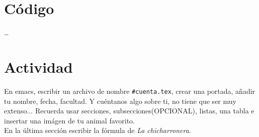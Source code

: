 \documentclass[11pt]{article} %
\begin{document}
\section{Código}
\dots

\section{Actividad}
En emacs, escribir un archivo de nombre \texttt{\#cuenta.tex}, crear una portada,
añadir tu nombre, fecha, facultad. Y cuéntanos algo sobre ti, no tiene que ser
muy extenso... Recuerda usar secciones, subsecciones(OPCIONAL), listas, una
tabla e insertar una imágen de tu animal favorito.\\
En la última sección escribir la fórmula de \textit{La chicharronera}.
\end{document}
